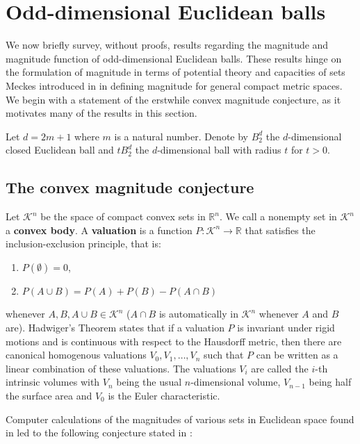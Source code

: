 \documentclass[11pt]{article}
\theoremstyle{mythm}
\begin{document}
\section{Odd-dimensional Euclidean balls}

We now briefly survey, without proofs, results regarding the magnitude and magnitude function of odd-dimensional Euclidean balls. These results hinge on the formulation of magnitude in terms of potential theory and capacities of sets Meckes introduced in \cite{meckes_magnitude_2015} in defining magnitude for general compact metric spaces. We begin with a statement of the erstwhile convex magnitude conjecture, as it motivates many of the results in this section.

Let $d = 2m+1$ where $m$ is a natural number. Denote by $B_2^d$ the $d$-dimensional closed Euclidean ball and $tB_2^d$ the $d$-dimensional ball with radius $t$ for $t > 0$.

\subsection{The convex magnitude conjecture}

Let $\mathcal{K}^n$ be the space of compact convex sets in $\mathbb{R}^n$. We call a nonempty set in $\mathcal{K}^n$ a \textbf{convex body}. A \textbf{valuation} is a function $P:\mathcal{K}^n \to\mathbb{R}$ that satisfies the inclusion-exclusion principle, that is:
\begin{enumerate}[label=$\bullet$]
\item $P(\emptyset) = 0$,
\item $P(A\cup B) = P(A) + P(B) - P(A\cap B)$
\end{enumerate}
whenever $A,B,A\cup B \in \mathcal{K}^n$ ($A\cap B$ is automatically in $\mathcal{K}^n$ whenever $A$ and $B$ are). Hadwiger's Theorem states that if a valuation $P$ is invariant under rigid motions and is continuous with respect to the Hausdorff metric, then there are canonical homogenous valuations $V_0,V_1,\dots,V_n$ such that $P$ can be written as a linear combination of these valuations. The valuations $V_i$ are called the $i$-th intrinsic volumes with $V_n$ being the usual $n$-dimensional volume, $V_{n-1}$ being half the surface area and $V_0$ is the Euler characteristic.

Computer calculations of the magnitudes of various sets in Euclidean space found in \cite{willerton_heuristic_2009} led to the following conjecture stated in \cite{leinster_asymptotic_2013}:
\end{document}
